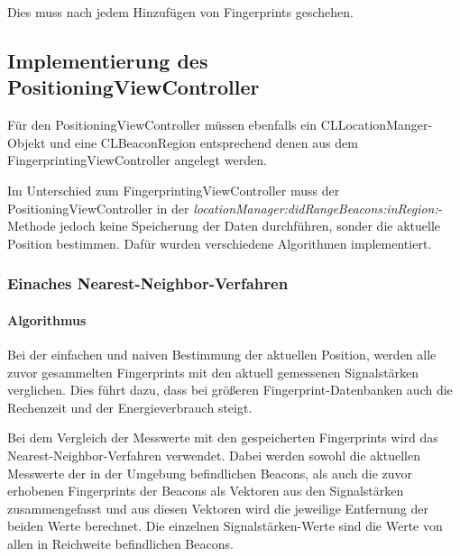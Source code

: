 Dies muss nach jedem Hinzufügen von Fingerprints geschehen.



\subsection{Implementierung des PositioningViewController}
\label{sec:}

Für den PositioningViewController müssen ebenfalls ein CLLocationManger-Objekt und eine CLBeaconRegion entsprechend denen aus dem FingerprintingViewController angelegt werden.

Im Unterschied zum FingerprintingViewController muss der PositioningViewController in der \emph{locationManager:didRangeBeacons:inRegion:}-Methode jedoch keine Speicherung der Daten durchführen, sonder die aktuelle Position bestimmen. Dafür wurden verschiedene Algorithmen implementiert.



\subsubsection{Einaches Nearest-Neighbor-Verfahren}
\label{sec:}

\paragraph{Algorithmus}
\label{sec:}
Bei der einfachen und naiven Bestimmung der aktuellen Position, werden alle zuvor gesammelten Fingerprints mit den aktuell gemessenen Signalstärken verglichen. Dies führt dazu, dass bei größeren Fingerprint-Datenbanken auch die Rechenzeit und der Energieverbrauch steigt. 

Bei dem Vergleich der Messwerte mit den gespeicherten Fingerprints wird das Nearest-Neighbor-Verfahren verwendet. Dabei werden sowohl die aktuellen Messwerte der in der Umgebung befindlichen Beacons, als auch die zuvor erhobenen Fingerprints der Beacons als Vektoren aus den Signalstärken zusammengefasst und aus diesen Vektoren wird die jeweilige Entfernung der beiden Werte berechnet. Die einzelnen Signalstärken-Werte sind die Werte von allen in Reichweite befindlichen Beacons.

